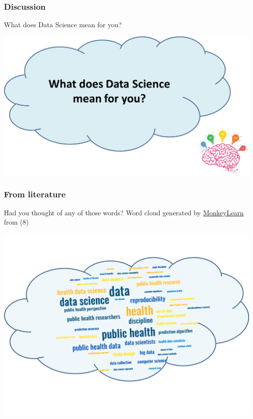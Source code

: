 \documentclass[
  letterpaper,
  DIV=11,
  numbers=noendperiod]{scrreprt}
\begin{document}
\hypertarget{discussion-2}{%
\subsubsection{\texorpdfstring{Discussion
{💬}}{Discussion 💬}}\label{discussion-2}}

What does Data Science mean for you?

\includegraphics{./images/paste-AC41DECB.png}

\hypertarget{from-literature}{%
\subsubsection{From literature}\label{from-literature}}

Had you thought of any of those words? Word cloud generated by
\href{https://monkeylearn.com/word-cloud/}{MonkeyLearn} from (8)

\includegraphics{./images/paste-FFA998D0.png}
\end{document}
